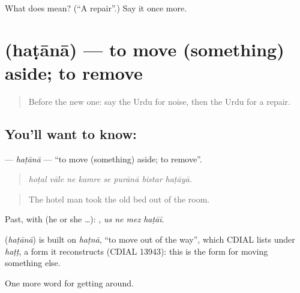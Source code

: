 \begin{tcolorbox}[breakable,colback=teal!4,colframe=teal!35!black,title={Before you move on}]
What does  mean? (\textquotedblleft{}A repair\textquotedblright{}.) Say it once more.
\end{tcolorbox}
\section[\texorpdfstring{\ur{ہٹانا} (haṭānā)}{ہٹانا (haṭānā)}]{ (haṭānā) — to move (something) aside; to remove}

\label{lesson:UR-C407-hatana}



\begin{quote}
Before the new one: say the Urdu for noise, then the Urdu for a repair.
\end{quote}

\subsection*{You'll want to know: }
\textbf{} — \emph{haṭānā} — \textquotedblleft{}to move (something) aside; to remove\textquotedblright{}.

\begin{quote}
       
\end{quote}

\begin{quote}
\emph{hoṭal vāle ne kamre se purānā bistar haṭāyā.}
\end{quote}

\begin{quote}
The hotel man took the old bed out of the room.
\end{quote}

Past, with  (he or she …):    , \emph{us ne mez haṭāī}.

\begin{cousinweb}
\textbf{} (\emph{haṭānā}) is built on \emph{haṭnā}, \textquotedblleft{}to move out of the way\textquotedblright{}, which CDIAL lists under \emph{haṭṭ}, a form it reconstructs (CDIAL 13943): this is the form for moving something else.
\end{cousinweb}

\begin{grammarlens}[title={What you've built}]
One more word for getting around.
\end{grammarlens}

